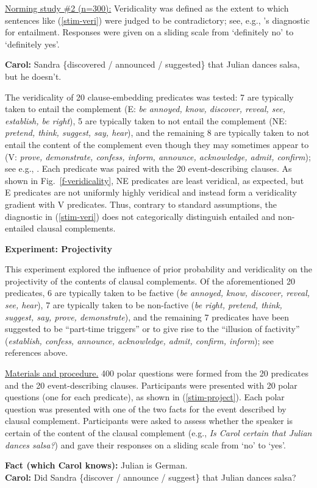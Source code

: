 \documentclass[12pt,fleqn]{article}
\newcommand{\citepos}[1]{\citeauthor{#1}'s \citeyear{#1}}
\newcommand{\6}{\mbox{$[\hspace*{-.6mm}[$}}
\newcommand{\9}{\mbox{$]\hspace*{-.6mm}]$}}
\begin{document}
\underline{Norming study \#2 (n=300):} Veridicality was defined as the extent to which sentences like (\ref{stim-veri}) were judged to be contradictory; see, e.g., \citepos{ccmg90} diagnostic for entailment. Responses were given on a sliding scale from `definitely no' to `definitely yes'. 
\vspace*{-.2cm}
\begin{exe}
\ex\label{stim-veri} {\bf Carol:} Sandra \{discovered / announced / suggested\} that Julian dances salsa, but he doesn't. 
\end{exe}
\vspace*{-.2cm}
The veridicality of 20 clause-embedding predicates was tested: 7 are typically taken to entail the complement (E: {\em be annoyed, know, discover, reveal, see, establish, be right}), 5 are typically taken to not entail the complement (NE: {\em pretend, think, suggest, say, hear}), and the remaining 8 are typically taken to not entail the content of the complement even though they may sometimes appear to (V: {\em prove, demonstrate, confess, inform, announce, acknowledge, admit, confirm}); see e.g., \citealt{schlenker10,swanson2012,anand-hacquard2014}. Each predicate was paired with the 20 event-describing clauses. As shown in Fig.~\ref{f-veridicality}, NE predicates are least veridical, as expected, but E predicates are not uniformly highly veridical and instead form a veridicality gradient with V predicates. Thus, contrary to standard assumptions, the diagnostic in (\ref{stim-veri}) does not categorically distinguish entailed and non-entailed clausal complements.

{\bf Experiment: Projectivity}

This experiment explored the influence of prior probability and veridicality on the projectivity of the contents of clausal complements. Of the aforementioned 20 predicates, 6 are typically taken to be factive ({\em be annoyed, know, discover, reveal, see, hear}), 7 are typically taken to be non-factive ({\em be right, pretend, think, suggest, say, prove, demonstrate}), and the remaining 7 predicates have been suggested to be ``part-time triggers'' or to give rise to the ``illusion of factivity'' ({\em establish,  confess, announce, acknowledge, admit, confirm, inform}); see references above.

\underline{Materials and procedure.} 400 polar questions were formed from the 20 predicates and the 20 event-describing clauses. Participants were presented with 20 polar questions (one for each predicate), as shown in (\ref{stim-project}). Each polar question was presented with one of the two facts for the event described by clausal complement. Participants were asked to assess whether the speaker is certain of the content of the clausal complement (e.g., \emph{Is Carol certain that Julian dances salsa?}) and gave their responses on a sliding scale from `no' to `yes'. 
\vspace*{-.2cm}
\begin{exe}
\ex\label{stim-project} {\bf Fact (which Carol knows):} Julian is German.  \\ 
{\bf Carol:} Did Sandra \{discover / announce / suggest\} that Julian dances salsa?
\end{exe}
\vspace*{-.2cm}
\end{document}
